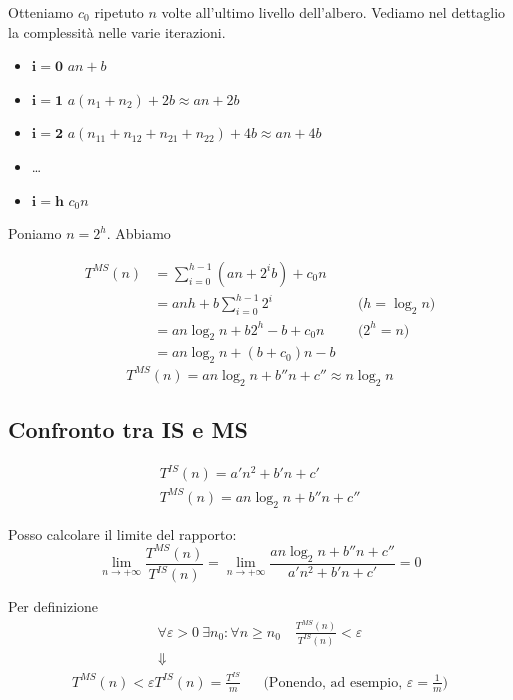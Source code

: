 Otteniamo $c_0$ ripetuto $n$ volte all'ultimo livello dell'albero. Vediamo nel dettaglio la complessità
nelle varie iterazioni.
\begin{itemize}
	\item[] $\boldsymbol{i=0}$ \hspace{0.5cm} $an+b$
	\item[] $\boldsymbol{i=1}$ \hspace{0.5cm} $a(n_1+n_2)+2b \approx an+2b$
	\item[] $\boldsymbol{i=2}$ \hspace{0.5cm} $a(n_{11}+n_{12}+n_{21}+n_{22})+4b \approx an+4b$
	\item[] \dots
	\item[] $\boldsymbol{i=h}$ \hspace{0.5cm} $c_0n$
\end{itemize}

Poniamo $n=2^h$. Abbiamo

\begin{align*}
	T^{MS}(n) 	& = \displaystyle\sum_{i=0}^{h-1}(an+2^ib)+c_0n \\
				& = anh+b\displaystyle\sum_{i=0}^{h-1}2^i && \text{($h= \log_2n$)}\\
				& = an \log_2n + b2^h - b + c_0n && \text{($2^h=n$)} \\
				& = an \log_2n + (b+c_0)n - b
\end{align*}
\begin{displaymath}
	T^{MS}(n) = an \log_2n + b''n + c'' \approx n \log_2n
\end{displaymath}

\subsection{Confronto tra IS e MS}

\begin{gather*}
	T^{IS}(n) = a'n^2 + b'n + c' \\
	T^{MS}(n) = an \log_2n + b''n + c''
\end{gather*}

Posso calcolare il limite del rapporto:
\begin{displaymath}
	\lim_{n \to +\infty} \frac{T^{MS}(n)}{T^{IS}(n)} = \lim_{n \to +\infty} \frac{an \log_2n + b''n + c''}{a'n^2 + b'n + c'} = 0
\end{displaymath}

Per definizione
\begin{gather*}
	\forall \varepsilon > 0 \ \exists n_0 : \forall n \geq n_0 \quad \frac{T^{MS}(n)}{T^{IS}(n)} < \varepsilon \\
	\Downarrow
\end{gather*}
\begin{align*}
	T^{MS}(n) < \varepsilon T^{IS}(n) = \frac{T^{IS}}{m} && \text{(Ponendo, ad esempio, $\varepsilon = \frac{1}{m}$)}
\end{align*}

